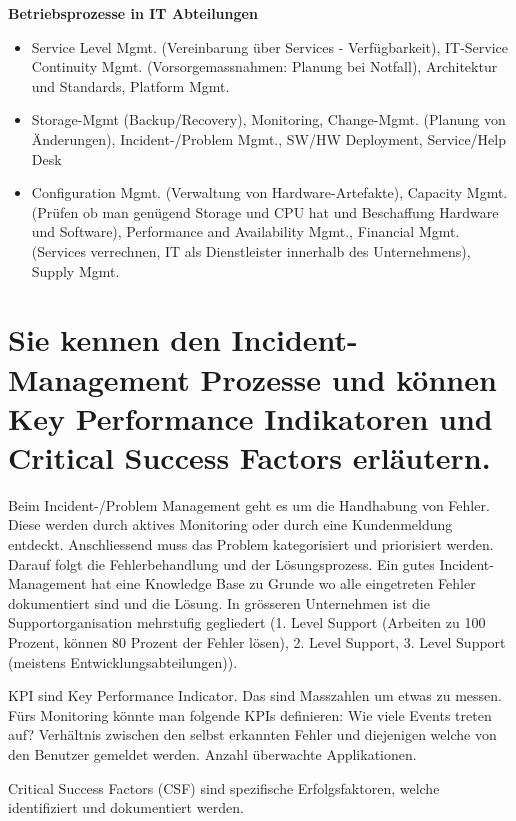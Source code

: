 \textbf{Betriebsprozesse in IT Abteilungen}
\begin{itemize}
	\item Service Level Mgmt. (Vereinbarung über Services - Verfügbarkeit), IT-Service Continuity Mgmt. (Vorsorgemassnahmen: Planung bei Notfall), Architektur und Standards, Platform Mgmt.
	
	\item Storage-Mgmt (Backup/Recovery), Monitoring, Change-Mgmt. (Planung von Änderungen),  Incident-/Problem Mgmt., SW/HW Deployment, Service/Help Desk
	
	\item Configuration Mgmt. (Verwaltung von Hardware-Artefakte), Capacity Mgmt. (Prüfen ob man genügend Storage und CPU hat und Beschaffung Hardware und Software), Performance and Availability Mgmt., Financial Mgmt. (Services verrechnen, IT als Dienstleister innerhalb des Unternehmens), Supply Mgmt.
\end{itemize}

\section{Sie kennen den Incident-Management Prozesse und können Key Performance Indikatoren und Critical Success Factors erläutern.}

Beim Incident-/Problem Management geht es um die Handhabung von Fehler. Diese werden durch aktives Monitoring oder durch eine Kundenmeldung entdeckt. Anschliessend muss das Problem kategorisiert und priorisiert werden. Darauf folgt die Fehlerbehandlung und der Lösungsprozess. Ein gutes Incident-Management hat eine Knowledge Base zu Grunde wo alle eingetreten Fehler dokumentiert sind und die Lösung. In grösseren Unternehmen ist die Supportorganisation mehrstufig gegliedert (1. Level Support (Arbeiten zu 100 Prozent, können 80 Prozent der Fehler lösen), 2. Level Support, 3. Level Support (meistens Entwicklungsabteilungen)).

KPI sind Key Performance Indicator. Das sind Masszahlen um etwas zu messen. Fürs Monitoring könnte man folgende KPIs definieren: Wie viele Events treten auf? Verhältnis zwischen den selbst erkannten Fehler und diejenigen welche von den Benutzer gemeldet werden. Anzahl überwachte Applikationen.

Critical Success Factors (CSF) sind spezifische Erfolgsfaktoren, welche identifiziert und dokumentiert werden.
